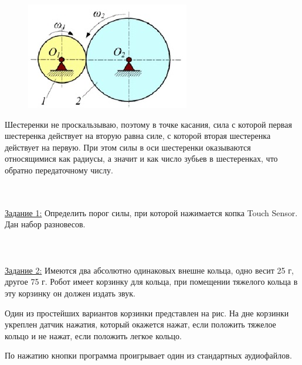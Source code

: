 \begin{figure}[h!]
	\begin{center}
		\includegraphics[width=0.45\linewidth]{chapters/chapter20/images/4}
		\caption{}
		\label{ris:image20x4}
	\end{center}
\end{figure}

Шестеренки не проскальзываю, поэтому в точке касания, сила с которой первая шестеренка действует на вторую равна силе, с которой вторая шестеренка действует на первую. При этом силы в оси шестеренки оказываются относящимися как радиусы, а значит и как число зубьев в шестеренках, что обратно передаточному числу.

{\hypertarget{lesson20x4}{}}\\\\

\noindent\underline{Задание 1:} Определить порог силы, при которой нажимается копка Touch Sensor.\\
Дан набор разновесов.\\\\

\\\\

\noindent\underline{Задание 2:} Имеются два абсолютно одинаковых внешне кольца, одно весит 25 г, другое 75 г. Робот имеет корзинку для кольца, при помещении тяжелого кольца в эту корзинку он должен издать звук.

Один из простейших вариантов корзинки  представлен на рис. На дне корзинки укреплен датчик нажатия, который окажется нажат, если положить тяжелое кольцо  и не нажат, если положить легкое кольцо. 

По нажатию кнопки программа проигрывает один из стандартных аудиофайлов.\\\\

{\programm
	{\slshape{}}\indent\indent{}\\
	\rC{\{}\\
	\indent{}\indent{}\\
	\rC{\}}\\
}\\\\


